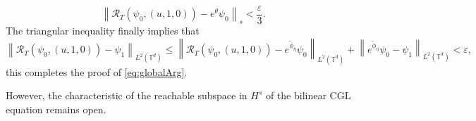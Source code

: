 \documentclass[review]{elsarticle}
\theoremstyle{dotless}
\def \leq{\leqslant}
\numberwithin{equation}{section}
\begin{document}
\begin{equation*} 
	\left\|\mathcal{R}_T\left(\psi_0, (u,1,0)\right)-e^{ \theta} \psi_0\right\|_s<\frac{\varepsilon}{3}.
\end{equation*}
The triangular inequality finally implies that
\begin{equation*}
	\left\|\mathcal{R}_T\left(\psi_0, (u,1,0)\right)-  \psi_1\right\|_{L^2\left(\mathbb{T}^d\right)} \leq \left\|\mathcal{R}_T\left(\psi_0, (u,1,0)\right)-e^{ \widetilde{\phi}_\eta} \psi_0\right\|_{L^2\left(\mathbb{T}^d\right)}+\left\|e^{\widetilde{\phi}_\eta} \psi_0-\psi_1\right\|_{L^2\left(\mathbb{T}^d\right)}<\varepsilon,
\end{equation*}this completes the proof of \eqref{eq:globalArg}.

However, the characteristic of the reachable subspace in $H^s$ of the bilinear CGL equation remains open. 

\newpage
\end{document}
